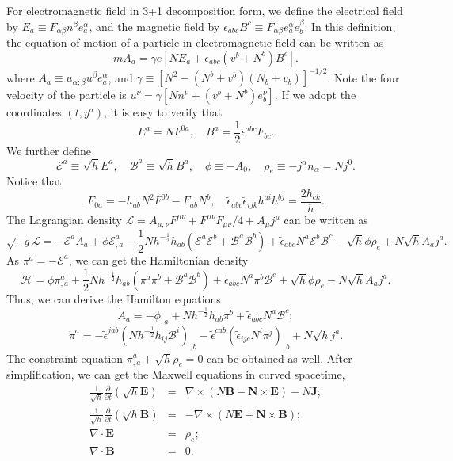 \begin{example}
For electromagnetic field in 3+1 decomposition form, we define the electrical field by 
$E_a \equiv F_{\alpha \beta} n^{\beta} e_a^{\alpha}$, 
and the magnetic field by 
$\epsilon_{abc} B^c \equiv F_{\alpha \beta} e_a^{\alpha} e_b^{\beta}$. 
In this definition, the equation of motion of a particle in electromagnetic field can be written as
\[m A_a = \gamma e [NE_a + \epsilon_{abc} (v^b+N^b) B^c].\]
where $A_a \equiv u_{\alpha;\beta} u^{\beta} e_a^{\alpha}$, and $\gamma \equiv [N^2-(N^b+v^b)(N_b+v_b)]^{-1/2}$.
Note the four velocity of the particle is $u^{\nu} = \gamma [Nn^{\nu} + (v^b + N^b) e_{b}^{\nu}]$.
If we adopt the coordinates $(t,y^a)$, it is easy to verify that
\[E^a = N F^{0a}, \quad B^a = \frac{1}{2} \epsilon^{abc} F_{bc}.\]
We further define
\[\mathscr{E}^a \equiv \sqrt{h} E^a, \quad \mathscr{B}^a \equiv \sqrt{h} B^a, \quad \phi \equiv - A_0, \quad \rho_{e} \equiv -j^{\alpha} n_{\alpha} = N j^0.\]
Notice that
\[F_{0a} = -h_{ab}N^2F^{0b} - F_{ab}N^b, \quad \tilde{\epsilon}_{abc} \tilde{\epsilon}_{ijk} h^{ai} h^{bj} = \frac{2h_{ck}}{h}.\]
The Lagrangian density $\mathcal{L} = A_{\mu,\nu}F^{\mu\nu} + F^{\mu\nu}F_{\mu\nu}/4 + A_{\mu}j^{\mu} $ can be written as
\[ \sqrt{-g} \mathcal{L} = - \mathscr{E}^a \dot{A_a} + \phi \mathscr{E}^a_{,a} - \frac{1}{2} N h^{-\frac{1}{2}} h_{ab} (\mathscr{E}^a \mathscr{E}^b + \mathscr{B}^a \mathscr{B}^b) + \tilde{\epsilon}_{abc}N^a \mathscr{E}^b \mathscr{B}^c -\sqrt{h} \phi \rho_e + N \sqrt{h} A_a j^a.\]
As $\pi^a = -\mathscr{E}^a$, we can get the Hamiltonian density
\[\mathcal{H} = \phi \pi^a_{,a} + \frac{1}{2} N h^{-\frac{1}{2}} h_{ab} (\pi^a \pi^b + \mathscr{B}^a \mathscr{B}^b) + \tilde{\epsilon}_{abc}N^a \pi^b \mathscr{B}^c +\sqrt{h} \phi \rho_e - N \sqrt{h} A_a j^a.\]
Thus, we can derive the Hamilton equations
\[\dot{A}_a = -\phi_{,a} + N h^{-\frac{1}{2}} h_{ab}\pi^b + \tilde{\epsilon}_{abc}N^a \mathscr{B}^c;\]
\[\dot{\pi}^a = - \tilde{\epsilon}^{jab}(Nh^{-\frac{1}{2}}h_{ij}\mathscr{B}^i)_{,b} - \tilde{\epsilon}^{cab}(\tilde{\epsilon}_{ijc}N^i \pi^j)_{,b} + N\sqrt{h}j^a .\]
The constraint equation $\pi^a_{,a} + \sqrt{h}\rho_e = 0$ can be obtained as well.
After simplification, we can get the Maxwell equations in curved spacetime,
\begin{eqnarray}
\frac{1}{\sqrt{h}}\frac{\partial}{\partial t}(\sqrt{h} \bm{E}) &=& \nabla \times (N \bm{B} - \bm{N} \times \bm{E}) - N \bm{J}; \nonumber \\
\frac{1}{\sqrt{h}}\frac{\partial}{\partial t}(\sqrt{h} \bm{B}) &=& -\nabla \times (N \bm{E} + \bm{N} \times \bm{B}) ;\nonumber \\
\nabla \cdot \bm{E} &=& \rho_e ;\nonumber \\
\nabla \cdot \bm{B} &=& 0. \nonumber
\end{eqnarray}
\end{example}

